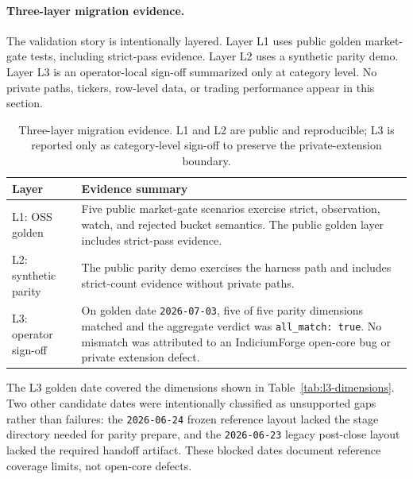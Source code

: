 \documentclass[11pt]{article}
\begin{document}
\paragraph{Three-layer migration evidence.}

The validation story is intentionally layered. Layer L1 uses public golden market-gate tests,
including strict-pass evidence. Layer L2 uses a synthetic parity demo. Layer L3 is an
operator-local sign-off summarized only at category level. No private paths, tickers, row-level
data, or trading performance appear in this section.

\begin{table}[t]
\centering
\small
\begin{tabularx}{\linewidth}{lY}
\toprule
Layer & Evidence summary \\
\midrule
L1: OSS golden & Five public market-gate scenarios exercise strict, observation, watch, and rejected bucket semantics. The public golden layer includes strict-pass evidence. \\
L2: synthetic parity & The public parity demo exercises the harness path and includes strict-count evidence without private paths. \\
L3: operator sign-off & On golden date \texttt{2026-07-03}, five of five parity dimensions matched and the aggregate verdict was \texttt{all\_match: true}. No mismatch was attributed to an IndiciumForge open-core bug or private extension defect. \\
\bottomrule
\end{tabularx}
\caption{Three-layer migration evidence. L1 and L2 are public and reproducible; L3 is
reported only as category-level sign-off to preserve the private-extension boundary.}
\label{tab:case-layers}
\end{table}

The L3 golden date covered the dimensions shown in Table~\ref{tab:l3-dimensions}. Two other
candidate dates were intentionally classified as unsupported gaps rather than failures: the
\texttt{2026-06-24} frozen reference layout lacked the stage directory needed for parity
prepare, and the \texttt{2026-06-23} legacy post-close layout lacked the required handoff
artifact. These blocked dates document reference coverage limits, not open-core defects.
\end{document}

